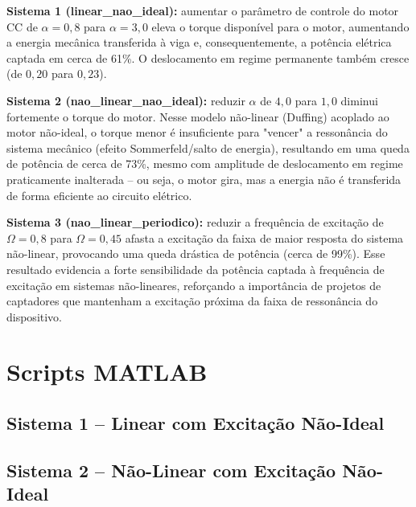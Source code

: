 \documentclass[a4paper,11pt]{article}
\begin{document}
\textbf{Sistema 1 (linear\_nao\_ideal):} aumentar o parâmetro de
controle do motor CC de $\alpha=0{,}8$ para $\alpha=3{,}0$ eleva o
torque disponível para o motor, aumentando a energia mecânica
transferida à viga e, consequentemente, a potência elétrica captada em
cerca de 61\%. O deslocamento em regime permanente também cresce (de
$0{,}20$ para $0{,}23$).

\textbf{Sistema 2 (nao\_linear\_nao\_ideal):} reduzir $\alpha$ de
$4{,}0$ para $1{,}0$ diminui fortemente o torque do motor. Nesse
modelo não-linear (Duffing) acoplado ao motor não-ideal, o torque menor
é insuficiente para "vencer" a ressonância do sistema mecânico
(efeito Sommerfeld/salto de energia), resultando em uma queda de
potência de cerca de 73\%, mesmo com amplitude de deslocamento em
regime praticamente inalterada -- ou seja, o motor gira, mas a energia
não é transferida de forma eficiente ao circuito elétrico.

\textbf{Sistema 3 (nao\_linear\_periodico):} reduzir a frequência de
excitação de $\Omega=0{,}8$ para $\Omega=0{,}45$ afasta a excitação da
faixa de maior resposta do sistema não-linear, provocando uma queda
drástica de potência (cerca de 99\%). Esse resultado evidencia a forte
sensibilidade da potência captada à frequência de excitação em sistemas
não-lineares, reforçando a importância de projetos de captadores que
mantenham a excitação próxima da faixa de ressonância do dispositivo.

\section{Scripts MATLAB}
\label{sec:scripts2}

\subsection{Sistema 1 -- Linear com Excitação Não-Ideal}



\subsection{Sistema 2 -- Não-Linear com Excitação Não-Ideal}


\end{document}
